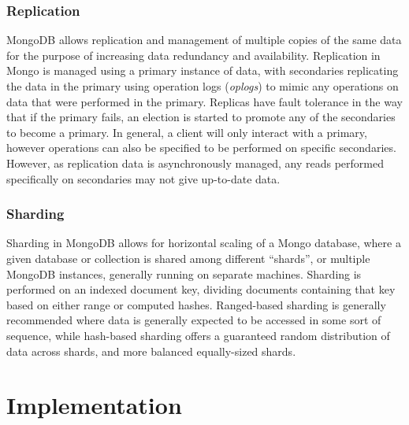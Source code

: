 \documentclass[a4paper,11pt]{article}
\begin{document}

\subsubsection{Replication} %
\label{ssub:replication}

MongoDB allows replication and management of multiple copies of the same data for the purpose of increasing data
redundancy and availability. Replication in Mongo is managed using a primary instance of data, with secondaries replicating
the data in the primary using operation logs (\textit{oplogs}) to mimic any operations on data that were performed in the
primary. Replicas have fault tolerance in the way that if the primary fails, an election is started to promote any of the
secondaries to become a primary. In general, a client will only interact with a primary, however operations can also be
specified to be performed on specific secondaries. However, as replication data is asynchronously managed, any reads
performed specifically on secondaries may not give up-to-date data.


\subsubsection{Sharding} %
\label{ssub:sharding}

Sharding in MongoDB allows for horizontal scaling of a Mongo database, where a given database or collection is shared
among different ``shards'', or multiple MongoDB instances, generally running on separate machines. Sharding is performed
on an indexed document key, dividing documents containing that key based on either range or computed hashes. Ranged-based
sharding is generally recommended where data is generally expected to be accessed in some sort of sequence, while hash-based
sharding offers a guaranteed random distribution of data across shards, and more balanced equally-sized shards.






\newpage

\section{Implementation} %
\label{sec:implementation}
\end{document}
